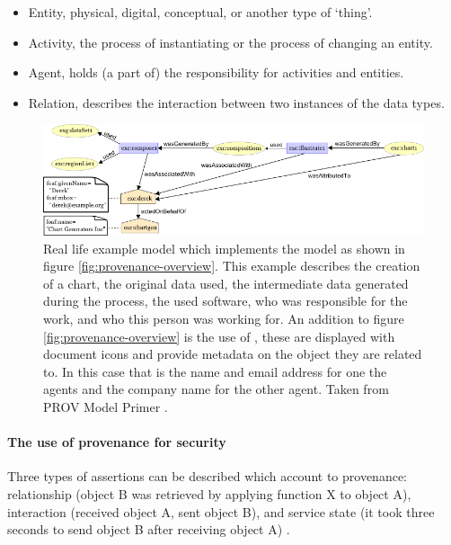 \begin{itemize}
	\item Entity, physical, digital, conceptual, or another type of `thing'.
	\item Activity, the process of instantiating or the process of changing an entity.
	\item Agent, holds (a part of) the responsibility for activities and entities.
	\item Relation, describes the interaction between two instances of the data types.
\end{itemize}

\begin{figure}
	\centering
	\includegraphics[width=1.0\linewidth]{images/provenance-large-schema}
	\caption{
		Real life example model which implements the model as shown in figure \ref{fig:provenance-overview}.
		This example describes the creation of a chart, the original data used, the intermediate data generated during the process, the used software, who was responsible for the work, and who this person was working for.
		An addition to figure \ref{fig:provenance-overview} is the use of \attributes{}, these are displayed with document icons and provide metadata on the object they are related to.
		In this case that is the name and email address for one the agents and the company name for the other agent.
		Taken from PROV Model Primer \cite{dsp8gil}.
	}
	\label{fig:provenance-large-schema}
\end{figure}

\paragraph{The use of provenance for security}
\label{provenance-use}

Three types of assertions can be described which account to provenance: relationship (object B was retrieved by applying function X to object A), interaction (received object A, sent object B), and service state (it took three seconds to send object B after receiving object A) \cite{dsp4moreau}.

